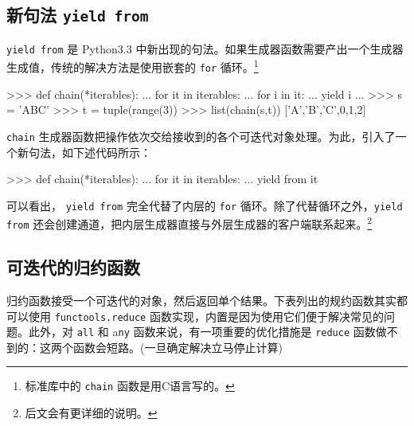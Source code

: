 \subsection{新句法 \texttt{yield from}}

\texttt{yield from} 是 Python3.3 中新出现的句法。如果生成器函数需要产出一个生成器生成值，传统的解决方法是使用嵌套的 \texttt{for} 循环。\footnote{标准库中的 \texttt{chain} 函数是用C语言写的。}

\begin{python}
>>> def chain(*iterables):
...     for it in iterables:
...         for i in it:
...             yield i
... 
>>> s = 'ABC'
>>> t = tuple(range(3))
>>> list(chain(s,t))
['A','B','C',0,1,2]
\end{python}

\texttt{chain} 生成器函数把操作依次交给接收到的各个可迭代对象处理。为此，引入了一个新句法，如下述代码所示：

\begin{python}
>>> def chain(*iterables):
...     for it in iterables:
...         yield from it
\end{python}

可以看出， \texttt{yield from} 完全代替了内层的 \texttt{for} 循环。除了代替循环之外，\texttt{yield from} 还会创建通道，把内层生成器直接与外层生成器的客户端联系起来。\footnote{后文会有更详细的说明。}

\subsection{可迭代的归约函数}

归约函数接受一个可迭代的对象，然后返回单个结果。下表列出的规约函数其实都可以使用 \texttt{functools.reduce} 函数实现，内置是因为使用它们便于解决常见的问题。此外，对 \texttt{all} 和 a\texttt{ny} 函数来说，有一项重要的优化措施是 \texttt{reduce} 函数做不到的：这两个函数会短路。(一旦确定解决立马停止计算)

